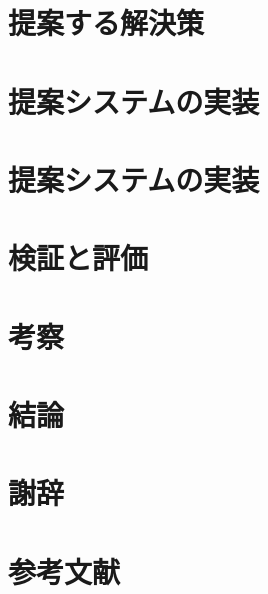 \documentclass[a4paper]{jreport}
\begin{document}
\chapter{提案する解決策}


\chapter{提案システムの実装}


\chapter{提案システムの実装}

\chapter{検証と評価}

\chapter{考察}
\chapter{結論}
\chapter{謝辞}
\chapter{参考文献}
\end{document}
